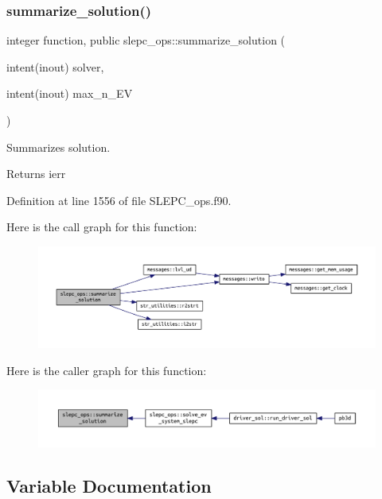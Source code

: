 \subsubsection{\texorpdfstring{summarize\+\_\+solution()}{summarize\_solution()}}
{\footnotesize\ttfamily integer function, public slepc\+\_\+ops\+::summarize\+\_\+solution (\begin{DoxyParamCaption}\item[{intent(inout)}]{solver,  }\item[{intent(inout)}]{max\+\_\+n\+\_\+\+EV }\end{DoxyParamCaption})}



Summarizes solution. 

\begin{DoxyReturn}{Returns}
ierr 
\end{DoxyReturn}


Definition at line 1556 of file S\+L\+E\+P\+C\+\_\+ops.\+f90.

Here is the call graph for this function\+:\nopagebreak
\begin{figure}[H]
\begin{center}
\leavevmode
\includegraphics[width=350pt]{namespaceslepc__ops_a03193dbc55e7061891d58e96a2bf1dd5_cgraph}
\end{center}
\end{figure}
Here is the caller graph for this function\+:\nopagebreak
\begin{figure}[H]
\begin{center}
\leavevmode
\includegraphics[width=350pt]{namespaceslepc__ops_a03193dbc55e7061891d58e96a2bf1dd5_icgraph}
\end{center}
\end{figure}


\subsection{Variable Documentation}
\mbox{\label{namespaceslepc__ops_ad57b5fd70608c1b97454963bdd1c4f5b}} 
